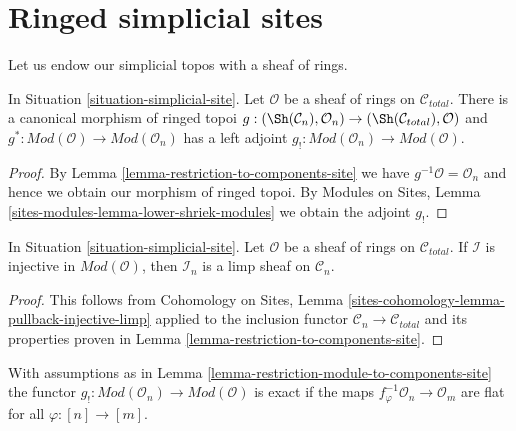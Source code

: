 \section{Ringed simplicial sites}
\label{section-simplicial-sites-modules}

\noindent
Let us endow our simplicial topos with a sheaf of rings.

\begin{lemma}
\label{lemma-restriction-module-to-components-site}
In Situation \ref{situation-simplicial-site}. Let $\mathcal{O}$
be a sheaf of rings on $\mathcal{C}_{total}$. There is a canonical
morphism of ringed topoi $g : (\Sh(\mathcal{C}_n), \mathcal{O}_n) \to
(\Sh(\mathcal{C}_{total}), \mathcal{O})$ and
$g^* : \textit{Mod}(\mathcal{O}) \to \textit{Mod}(\mathcal{O}_n)$
has a left adjoint
$g_! : \textit{Mod}(\mathcal{O}_n) \to \textit{Mod}(\mathcal{O})$.
\end{lemma}

\begin{proof}
By Lemma \ref{lemma-restriction-to-components-site} we have
$g^{-1}\mathcal{O} = \mathcal{O}_n$ and hence we obtain our
morphism of ringed topoi. By Modules on Sites, Lemma
\ref{sites-modules-lemma-lower-shriek-modules}
we obtain the adjoint $g_!$.
\end{proof}

\begin{lemma}
\label{lemma-restriction-injective-to-component-limp}
In Situation \ref{situation-simplicial-site}.
Let $\mathcal{O}$ be a sheaf of rings on $\mathcal{C}_{total}$.
If $\mathcal{I}$ is injective in $\textit{Mod}(\mathcal{O})$, then
$\mathcal{I}_n$ is a limp sheaf on $\mathcal{C}_n$.
\end{lemma}

\begin{proof}
This follows from
Cohomology on Sites, Lemma \ref{sites-cohomology-lemma-pullback-injective-limp}
applied to the inclusion functor $\mathcal{C}_n \to \mathcal{C}_{total}$
and its properties proven in Lemma \ref{lemma-restriction-to-components-site}.
\end{proof}

\begin{lemma}
\label{lemma-exactness-g-shriek-modules}
With assumptions as in
Lemma \ref{lemma-restriction-module-to-components-site} the functor
$g_! : \textit{Mod}(\mathcal{O}_n) \to \textit{Mod}(\mathcal{O})$
is exact if the maps $f_\varphi^{-1}\mathcal{O}_n \to \mathcal{O}_m$
are flat for all $\varphi : [n] \to [m]$.
\end{lemma}

